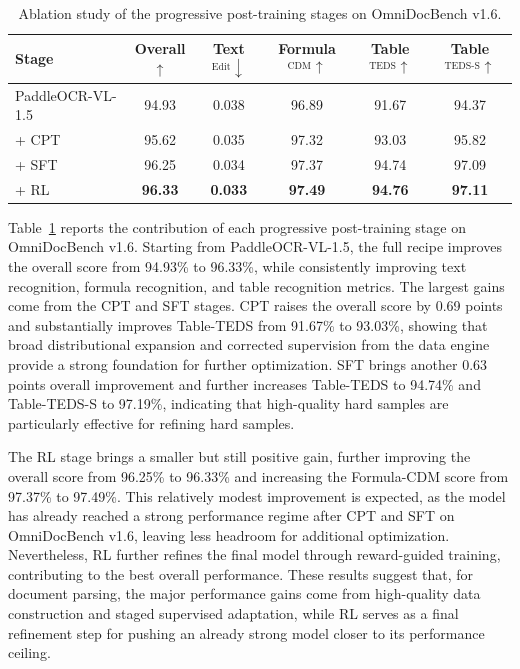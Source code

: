 \documentclass[11pt, a4paper,logo,  copyright, nonumbering]{paddleocr}
\begin{document}
\begin{table}[H]
    \centering
    \scriptsize
    \setlength{\tabcolsep}{5pt}
    \renewcommand{\arraystretch}{0.9}
    \begin{tabular}{l|c c c c c}
        \toprule
        \textbf{Stage} & \textbf{Overall$\uparrow$} & \textbf{Text$^{\mathrm{Edit}}\downarrow$} & \textbf{Formula$^{\mathrm{CDM}}\uparrow$} & \textbf{Table$^{\mathrm{TEDS}}\uparrow$} & \textbf{Table$^{\mathrm{TEDS\text{-}S}}\uparrow$} \\
        \midrule
        PaddleOCR-VL-1.5~\cite{cui2026paddleocrvl15multitask09bvlm} & 94.93 & 0.038 & 96.89 & 91.67 & 94.37 \\
        + CPT & 95.62 & 0.035 & 97.32 & 93.03 & 95.82 \\
        + SFT & 96.25 & 0.034 & 97.37 & 94.74 & 97.09 \\
        + RL & \textbf{96.33} & \textbf{0.033} & \textbf{97.49} & \textbf{94.76} & \textbf{97.11} \\
        \bottomrule
    \end{tabular}
    \caption{Ablation study of the progressive post-training stages on OmniDocBench v1.6.}
    \label{tab:ablation_study}
\end{table}

Table~\ref{tab:ablation_study} reports the contribution of each progressive post-training stage on OmniDocBench v1.6. Starting from PaddleOCR-VL-1.5, the full recipe improves the overall score from 94.93\% to 96.33\%, while consistently improving text recognition, formula recognition, and table recognition metrics. The largest gains come from the CPT and SFT stages. CPT raises the overall score by 0.69 points and substantially improves Table-TEDS from 91.67\% to 93.03\%, showing that broad distributional expansion and corrected supervision from the data engine provide a strong foundation for further optimization. SFT brings another 0.63 points overall improvement and further increases Table-TEDS to 94.74\% and Table-TEDS-S to 97.19\%, indicating that high-quality hard samples are particularly effective for refining hard samples.

The RL stage brings a smaller but still positive gain, further improving the overall score from 96.25\% to 96.33\% and increasing the Formula-CDM score from 97.37\% to 97.49\%. This relatively modest improvement is expected, as the model has already reached a strong performance regime after CPT and SFT on OmniDocBench v1.6, leaving less headroom for additional optimization. Nevertheless, RL further refines the final model through reward-guided training, contributing to the best overall performance. These results suggest that, for document parsing, the major performance gains come from high-quality data construction and staged supervised adaptation, while RL serves as a final refinement step for pushing an already strong model closer to its performance ceiling.
\end{document}
